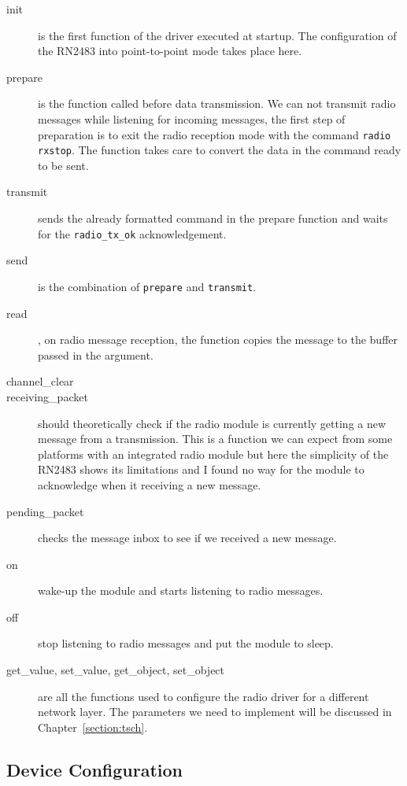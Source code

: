 \begin{description}
  \item[init] is the first function of the driver executed at startup.
    The configuration of the RN2483 into point-to-point mode takes place here.
  \item[prepare] is the function called before data transmission.
    We can not transmit radio messages while listening for incoming messages, the
    first step of preparation is to exit the radio reception mode with the
    command \lstinline{radio rxstop}.
    The function takes care to convert the data in the command ready to be sent.
  \item[transmit] sends the already formatted command in the prepare function and
    waits for the \lstinline{radio_tx_ok} acknowledgement.
  \item[send] is the combination of \lstinline{prepare} and
    \lstinline{transmit}.
  \item[read], on radio message reception, the function copies the 
    message to the buffer passed in the argument.
  \item[channel\_clear]
  \item[receiving\_packet] should theoretically check if the radio module is
    currently getting a new message from a transmission. This is a function we
    can expect from some platforms with an integrated radio module but here the
    simplicity of the RN2483 shows its limitations and I found no way for the module
    to acknowledge when it receiving a new message.
  \item[pending\_packet] checks the message inbox to see if we received a new
    message.
  \item[on] wake-up the module and starts listening to radio messages.
  \item[off] stop listening to radio messages and put the module to sleep.
  \item[get\_value, set\_value, get\_object, set\_object] are all the functions used
    to configure the radio driver for a different network layer. 
    The parameters we need to implement will be discussed in Chapter~\ref{section:tsch}.
\end{description}


\subsection{Device Configuration}

